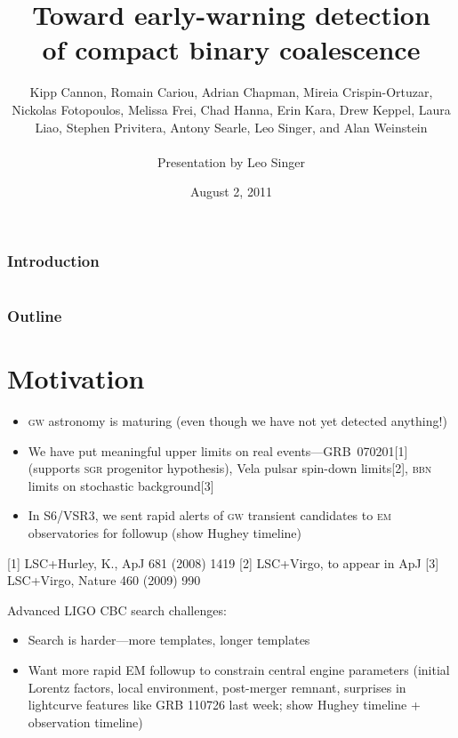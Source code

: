 \documentclass{beamer}
\title[LIGO-Gxxxxxxx-vx]{Toward early-warning detection \\ of compact binary coalescence}
\institute[LIGO Caltech]{LIGO Laboratory, California Institute of Technology}
\author[L Singer]{\footnotesize{
	Kipp Cannon,
	Romain Cariou,
	Adrian Chapman,
	Mireia Crispin-Ortuzar,
	Nickolas Fotopoulos,
	Melissa Frei,
	Chad Hanna,
	Erin Kara,
	Drew Keppel,
	Laura Liao,
	Stephen Privitera,
	Antony Searle,
	Leo Singer, and
	Alan Weinstein} \\~\\ Presentation by Leo Singer}
\date{August 2, 2011}
\begin{document}
\frame{\titlepage}


\begin{frame}
	\frametitle{Introduction}
\end{frame}


\section[Outline]{}
\begin{frame}
	\frametitle{Outline}
	\tableofcontents
\end{frame}


\section{Motivation}

\begin{frame}
	\begin{itemize}
		\item \textsc{gw} astronomy is maturing (even though we have not yet detected anything!)
	   \item We have put meaningful upper limits on real events---GRB\
	070201[1] (supports \textsc{sgr} progenitor hypothesis), Vela pulsar spin-down
	limits[2], \textsc{bbn} limits on stochastic background[3]
	   \item In S6/VSR3, we sent rapid alerts of \textsc{gw} transient candidates to
	\textsc{em} observatories for followup (show Hughey timeline)
	\end{itemize}
	
	[1] LSC+Hurley, K., ApJ 681 (2008) 1419
	[2] LSC+Virgo, to appear in ApJ
	[3] LSC+Virgo, Nature 460 (2009) 990
	
	Advanced LIGO CBC search challenges:
	\begin{itemize}
	\item Search is harder---more templates, longer templates
	\item Want more rapid EM followup to constrain central engine parameters
	(initial Lorentz factors, local environment, post-merger remnant,
	surprises in lightcurve features like GRB 110726 last week; show
	Hughey timeline + observation timeline)
	\end{itemize}
\end{frame}
\end{document}
